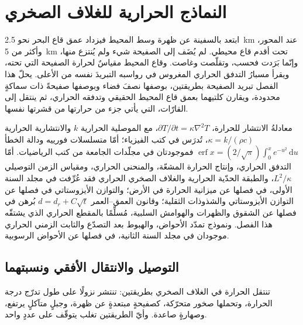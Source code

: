 \chapter{النماذج الحرارية للغلاف الصخري}\label{ch:b3:lithosphere-thermal-models}

ابتعد بالسفينة عن ظهرة وسط المحيط فيزداد عمق قاع البحر نحو
\qty{2.5}{km} عند المحور، وأكثر من \qty{5}{km} تحت أقدم
قاع محيطي. لم يُضَف إلى الصفيحة شيء ولم يُنتزع منها، وإنّما بَرَدت فحسب،
وتقلّصت وغاصت. وقاع المحيط مقياسٌ لحرارة الصفيحة التي تحته،
ويقرأ مسبارُ التدفق الحراري المغروس في رواسبه التبريدَ نفسه
من الأعلى. يحلّ هذا الفصل تبريد الصفيحة بطريقتين، بوصفها نصفَ فضاء
وبوصفها صفيحةً ذات سماكةٍ محدودة، ويقارن كلتيهما بعمق
قاع المحيط الحقيقي وتدفقه الحراري، ثم ينتقل إلى القارّات،
التي يأتي جزء من حرارتها من قشرتها نفسها.

\begin{recall}
معادلةُ الانتشار للحرارة، $\partial T/\partial t = \kappa\nabla^2T$،
مع الموصلية الحرارية $k$ والانتشارية الحرارية $\kappa =
k/(\rho c)$، تُدرَس في كتب الفيزياء؛ أمّا متسلسلات فورييه ودالة الخطأ
$\operatorname{erf}x = (2/\sqrt\pi)\int_0^xe^{-u^2}\,\mathrm du$ فموجودتان في
مجلّدات الجامعة من كتب الرياضيات. أمّا التدفق الحراري، وإنتاج الحرارة المشعّة،
والمنحنى الحراري، ومقياس الزمن التوصيلي $L^2/\kappa$، والطبقة الحدّية الحرارية
والغلاف الصخري الحراري فقد عُرِّفت في مجلد السنة الأولى،
في فصلها عن ميزانية الحرارة في الأرض؛ والتوازن الأيزوستاتي في فصلها
عن التوازن الأيزوستاتي والشذوذات الثقلية؛ وقانون العمق--العمر $d = d_r + C\sqrt t$ بُرهن في
فصلها عن الشقوق والظهرات والهوامش السلبية، مُسلِّمًا بالمقطع
الحراري الذي يشتقّه هذا الفصل. ونموذج تمدّد الأحواض، والهبوط بعد
التصدّع والثابت الزمني الحراري موجودان في مجلد السنة الثانية، في
فصلها عن الأحواض الرسوبية.
\end{recall}

\section{التوصيل والانتقال الأفقي ونسبتهما}

تنتقل الحرارة في الغلاف الصخري بطريقتين: تنتشر نزولًا على طول تدرّج
درجة الحرارة، وتحملها صخور متحرّكة، كصفيحةٍ مبتعدةٍ عن ظهرة،
وجبلٍ متآكلٍ يرتفع، وصهارةٍ صاعدة. وأيّ الطريقتين تغلب يتوقّف على
عددٍ واحد.

